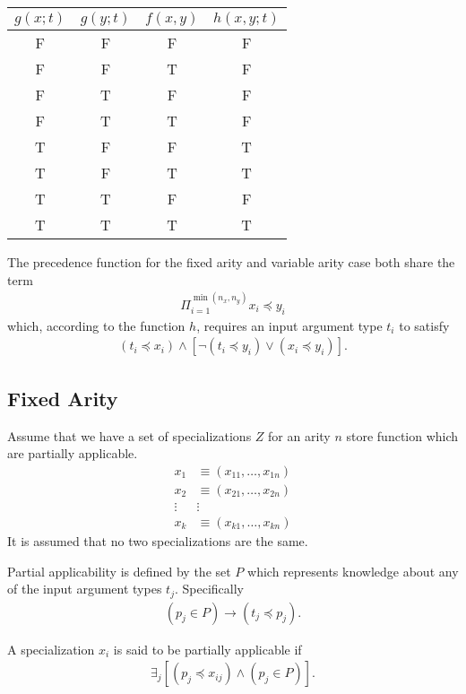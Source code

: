 \documentclass{article}
\begin{document}
\begin{table}[h]
\centering
\begin{tabular}{|c|c|c||c|}
\hline
$g(x;t)$ & $g(y;t)$ & $f(x,y)$ & $h(x,y;t)$ \\
\hline
F & F & F & F \\
F & F & T & F \\
F & T & F & F \\
F & T & T & F \\
T & F & F & T \\
T & F & T & T \\
T & T & F & F \\
T & T & T & T \\
\hline
\end{tabular}
\end{table}

The precedence function for the fixed arity and variable arity case
both share the term
\begin{align}
  \Pi_{i=1}^{\min(n_x,n_y)} x_i \preceq y_i
\end{align}
which, according to the function $h$, requires an input argument type
$t_i$ to satisfy
\begin{align}
  (t_i \preceq x_i) \land [\lnot (t_i \preceq y_i) \lor (x_i \preceq y_i)].
\end{align}

\subsection{Fixed Arity}
Assume that we have a set of specializations $Z$ for an arity $n$
store function which are partially applicable.
\begin{align}
  x_1 & \equiv (x_{11}, \dots, x_{1n}) \nonumber \\
  x_2 & \equiv (x_{21}, \dots, x_{2n}) \nonumber \\
  \vdots & \vdots                     \nonumber \\
  x_k & \equiv (x_{k1}, \dots, x_{kn}) \nonumber
\end{align}
It is assumed that no two specializations are the same.

Partial applicability is defined by the set $P$ which represents
knowledge about any of the input argument types $t_j$. Specifically
\begin{align}
  (p_j \in P) \rightarrow (t_j \preceq p_j)
.
\end{align}

A specialization $x_i$ is said to be partially applicable if
\begin{align}
  \exists_j \left[(p_j \preceq x_{ij}) \land (p_j \in P) \right]
.
\end{align}
\end{document}
